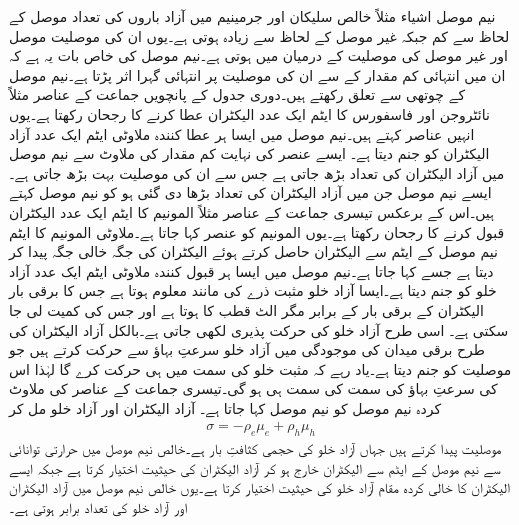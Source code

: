 نیم موصل اشیاء مثلاً خالص سلیکان اور جرمینیم میں آزاد باروں کی تعداد موصل کے لحاظ  سے کم جبکہ غیر موصل کے لحاظ  سے زیادہ ہوتی ہے۔یوں ان کی موصلیت موصل اور غیر موصل کی موصلیت کے درمیان میں ہوتی ہے۔نیم موصل کی خاص بات یہ ہے کہ ان میں انتہائی کم مقدار کے  سے ان کی موصلیت پر انتہائی گہرا اثر پڑتا ہے۔نیم موصل  کے چوتھی   سے تعلق رکھتے ہیں۔دوری جدول کے پانچویں جماعت کے عناصر مثلاً  نائٹروجن اور فاسفورس کا ایٹم ایک عدد الیکٹران عطا کرنے کا رجحان رکھتا ہے۔یوں انہیں  عناصر کہتے ہیں۔نیم موصل میں ایسا ہر عطا کنندہ ملاوٹی ایٹم ایک عدد آزاد الیکٹران کو جنم دیتا ہے۔ ایسے عنصر کی نہایت کم مقدار کی ملاوٹ سے نیم موصل میں آزاد الیکٹران کی تعداد بڑھ جاتی ہے جس سے ان کی موصلیت بہت بڑھ جاتی ہے۔ایسے نیم موصل جن میں آزاد الیکٹران کی تعداد بڑھا دی گئی ہو کو  نیم موصل کہتے ہیں۔اس کے برعکس تیسری جماعت کے عناصر مثلاً المونیم کا ایٹم ایک عدد الیکٹران قبول کرنے کا رجحان رکھتا ہے۔یوں المونیم کو  عنصر کہا جاتا ہے۔ملاوٹی المونیم کا ایٹم نیم موصل کے ایٹم سے الیکٹران حاصل کرتے ہوئے  الیکٹران کی جگہ خالی جگہ پیدا کر دیتا ہے جسے  کہا جاتا ہے۔نیم موصل میں ایسا ہر قبول کنندہ ملاوٹی ایٹم ایک عدد آزاد خلو کو جنم دیتا ہے۔ایسا آزاد خلو مثبت ذرے کی مانند معلوم ہوتا ہے جس کا برقی بار  الیکٹران کے  برقی بار  کے برابر مگر الٹ قطب کا ہوتا ہے اور جس کی کمیت  لی جا سکتی ہے۔ اسی طرح آزاد خلو کی حرکت پذیری  لکھی جاتی ہے۔بالکل آزاد الیکٹران کی طرح برقی میدان کی موجودگی میں آزاد خلو سرعتِ بہاؤ  سے حرکت کرتے ہیں جو موصلیت   کو جنم دیتا ہے۔یاد رہے کہ مثبت خلو  کی سمت میں ہی حرکت کرے گا لہٰذا اس کی  سرعتِ بہاؤ کی سمت  کی سمت ہی ہو گی۔تیسری جماعت کے عناصر کی ملاوٹ کردہ نیم موصل کو  نیم موصل کہا جاتا ہے۔
آزاد الیکٹران اور آزاد خلو مل کر 
\begin{align}
\sigma =-\rho_e \mu_e+\rho_h \mu_h
\end{align} 
موصلیت پیدا کرتے ہیں جہاں  آزاد خلو کی حجمی کثافتِ بار ہے۔خالص نیم موصل میں حرارتی توانائی سے نیم موصل کے ایٹم سے الیکٹران خارج ہو کر آزاد الیکٹران کی حیثیت اختیار کرتا ہے جبکہ ایسے الیکٹران کا خالی کردہ مقام آزاد خلو کی حیثیت اختیار کرتا ہے۔یوں خالص نیم موصل میں آزاد الیکٹران اور آزاد خلو کی تعداد برابر ہوتی ہے۔

